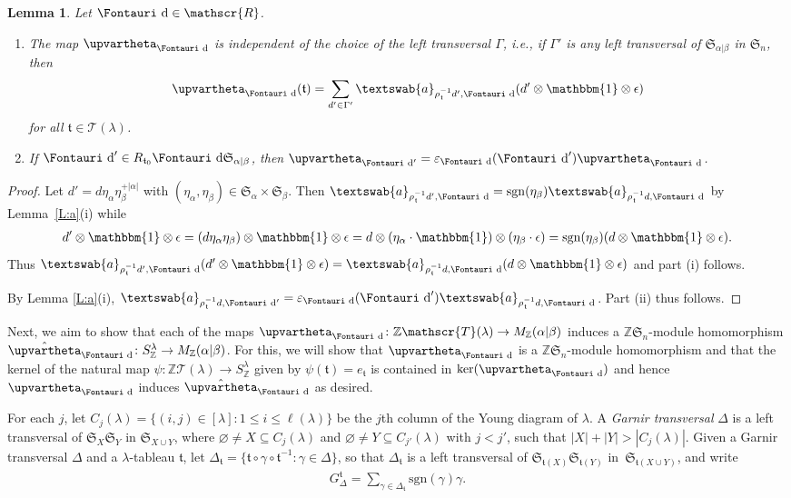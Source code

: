 \documentclass[pdftex]{sigma}
\newtheorem{Lemma}[Theorem]{Lemma}
\renewcommand{\t}{\mathfrak{t}}
\renewcommand{\a}{\textswab{a}}
\newcommand{\TT}{\mathscr{T}}
\newcommand{\sgn}{\mathrm{sgn}}
\newcommand{\sym}[1]{\mathfrak{S}_{#1}}
\newcommand{\bb}[1]{\mathbbm{{#1}}}
\newcommand{\R}{\mathscr{R}}
\newcommand{\dR}{\text{\Fontauri d}}
\newcommand{\e}{\varepsilon}
\newcommand{\Z}{\mathbb{Z}}
\newcommand{\Jhom}{\upvartheta}
\newcommand{\hJhom}{\hat{\Jhom}}
\begin{document}
\begin{Lemma} \label{L:Jhom}
Let $\dR \in \R$.
\begin{enumerate}\itemsep=0pt
 \item [$(i)$] The map $\Jhom_{\dR}$ is independent of the choice of the left transversal $\Gamma$, i.e., if $\Gamma'$ is any left transversal of $\sym{\alpha|\beta}$ in $\sym{n}$, then
 \begin{gather*}
 \Jhom_{\dR}(\t) = \sum_{d' \in \Gamma'} \a_{\rho_{\t}^{-1} d',\dR} (d' \otimes \bb{1} \otimes \epsilon)\end{gather*} for all $\t \in \TT(\lambda)$.
 \item [$(ii)$] If $\dR' \in R_{\t_0} \dR \sym{\alpha|\beta}$, then $\Jhom_{\dR'} = \e_{\dR}(\dR') \Jhom_{\dR}$.
\end{enumerate}
\end{Lemma}

\begin{proof} Let $d' = d \eta_{\alpha} \eta_{\beta}^{+|\alpha|}$ with $(\eta_{\alpha},\eta_{\beta}) \in \sym{\alpha} \times \sym{\beta}$. Then $\a_{\rho_{\t}^{-1}d',\dR} = \sgn(\eta_\beta) \a_{\rho_{\t}^{-1}d,\dR}$ by Lem\-ma~\ref{L:a}(i) while
\begin{gather*}d' \otimes \bb{1} \otimes \epsilon = (d \eta_{\alpha} \eta_{\beta}) \otimes \bb{1} \otimes \epsilon = d \otimes (\eta_{\alpha} \cdot \bb{1}) \otimes (\eta_{\beta} \cdot \epsilon) = \sgn(\eta_{\beta}) (d \otimes \bb{1} \otimes \epsilon).\end{gather*}
Thus $\a_{\rho_{\t}^{-1}d',\dR} (d' \otimes \bb{1} \otimes \epsilon) = \a_{\rho_{\t}^{-1}d,\dR} (d \otimes \bb{1} \otimes \epsilon)$ and part (i) follows.

By Lemma \ref{L:a}(i), $\a_{\rho_{\t}^{-1}d,\dR'} = \e_{\dR}(\dR') \a_{\rho_{\t}^{-1}d,\dR}$. Part (ii) thus follows.
\end{proof}

Next, we aim to show that each of the maps $\Jhom_{\dR}\colon \Z\TT(\lambda)\to M_\Z(\alpha|\beta)$ induces a $\Z\sym{n}$-module homomorphism $\hJhom_{\dR}\colon S^\lambda_\Z\to M_\Z(\alpha|\beta)$. For this, we will show that $\Jhom_{\dR}$ is a $\Z\sym{n}$-module homomorphism and that the kernel of the natural map $\psi\colon \Z\TT(\lambda)\to S^\lambda_\Z$ given by $\psi(\t)=e_\t$ is contained in $\ker(\Jhom_{\dR})$ and hence $\Jhom_{\dR}$ induces $\hJhom_{\dR}$ as desired.

For each $j$, let $C_j(\lambda) = \{ (i,j) \in [\lambda] \colon 1 \leq i \leq \ell(\lambda) \}$ be the $j$th column of the Young diagram of $\lambda$. A {\em Garnir transversal} $\Delta$ is a left transversal of $\sym{X}\sym{Y}$ in $\sym{X \cup Y}$, where $\varnothing \ne X \subseteq C_j(\lambda)$ and $\varnothing \ne Y \subseteq C_{j'}(\lambda)$ with $j < j'$, such that $|X|+|Y| > |C_j(\lambda)|$. Given a Garnir transversal $\Delta$ and a $\lambda$-tableau $\t$, let $\Delta_{\t} = \{ \t \circ \gamma \circ \t^{-1} \colon \gamma \in \Delta \}$, so that $\Delta_{\t}$ is a left transversal of $\sym{\t(X)}\sym{\t(Y)}$ in~$\sym{\t(X \cup Y)}$, and write
\begin{gather*}G_{\Delta}^{\t} = \sum_{\gamma \in \Delta_\t} \sgn(\gamma) \gamma.\end{gather*}
\end{document}
